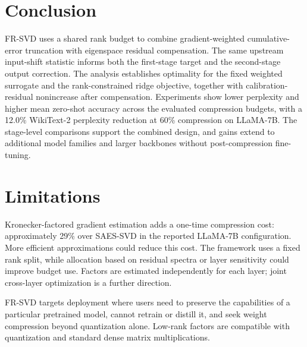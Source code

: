\documentclass[11pt]{article}
\begin{document}
\FloatBarrier
\section{Conclusion}\label{sec:conclusion}

FR-SVD uses a shared rank budget to combine gradient-weighted cumulative-error truncation with eigenspace residual compensation. The same upstream input-shift statistic informs both the first-stage target and the second-stage output correction. The analysis establishes optimality for the fixed weighted surrogate and the rank-constrained ridge objective, together with calibration-residual nonincrease after compensation. Experiments show lower perplexity and higher mean zero-shot accuracy across the evaluated compression budgets, with a 12.0\% WikiText-2 perplexity reduction at 60\% compression on LLaMA-7B. The stage-level comparisons support the combined design, and gains extend to additional model families and larger backbones without post-compression fine-tuning.
\label{main:end}

\section*{Limitations}

Kronecker-factored gradient estimation adds a one-time compression cost: approximately 29\% over SAES-SVD in the reported LLaMA-7B configuration. More efficient approximations could reduce this cost. The framework uses a fixed rank split, while allocation based on residual spectra or layer sensitivity could improve budget use. Factors are estimated independently for each layer; joint cross-layer optimization is a further direction.

FR-SVD targets deployment where users need to preserve the capabilities of a particular pretrained model, cannot retrain or distill it, and seek weight compression beyond quantization alone. Low-rank factors are compatible with quantization and standard dense matrix multiplications.


\clearpage
\appendix

\end{document}

